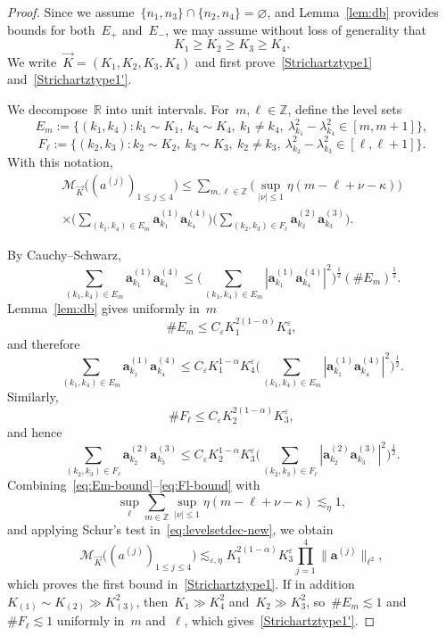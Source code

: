 \documentclass[11pt,reqno,english]{amsart}
\numberwithin{equation}{section}
\theoremstyle{plain}
\theoremstyle{definition}
\theoremstyle{remark}
\newcommand{\R}{\mathbb{R}}
\newcommand{\Z}{\mathbb{Z}}
\begin{document}
\begin{proof}
	Since we assume~$\{n_{1},n_{3}\}\cap\{n_{2},n_{4}\}=\varnothing$, and Lemma~\ref{lem:db}
	provides bounds for both~$E_{+}$ and~$E_{-}$, we may assume without loss of generality that
	\begin{equation}
		\label{eq:orderK}
		K_1\ge K_2\ge K_3\ge K_4.
	\end{equation}
	We write~$\vec K=(K_1,K_2,K_3,K_4)$ and first prove~\eqref{Strichartztype1} and~\eqref{Strichartztype1'}.

	We decompose~$\R$ into unit intervals. For~$m,\ell\in\Z$, define the level sets
	\[
	E_m:=\{(k_1,k_4): k_1\sim K_1,\ k_4\sim K_4,\ k_1\neq k_4,\
	\lambda_{k_1}^2-\lambda_{k_4}^2\in[m,m+1]\},
	\]
	\[
	F_\ell:=\{(k_2,k_3): k_2\sim K_2,\ k_3\sim K_3,\ k_2\neq k_3,\
	\lambda_{k_2}^2-\lambda_{k_3}^2\in[\ell,\ell+1]\}.
	\]
	With this notation,
	\begin{multline}
		\label{eq:levelsetdec-new}
		\mathcal{M}_{\vec{K}}\big((a^{(j)})_{1\le j\le 4}\big)
		\le
		\sum_{m,\ell\in\Z}
		\Big(\sup_{|\nu|\le 1}\eta(m-\ell+\nu-\kappa)\Big)
		\\
		\times
		\Big(\sum_{(k_1,k_4)\in E_m}
		\mathbf{a}^{(1)}_{k_1}\mathbf{a}^{(4)}_{k_4}\Big)
		\Big(\sum_{(k_2,k_3)\in F_\ell}
		\mathbf{a}^{(2)}_{k_2}\mathbf{a}^{(3)}_{k_3}\Big).
	\end{multline}

	By Cauchy--Schwarz,
	\[
	\sum_{(k_1,k_4)\in E_m}
	\mathbf{a}^{(1)}_{k_1}\mathbf{a}^{(4)}_{k_4}
	\le
	\Big(
	\sum_{(k_1,k_4)\in E_m}
	|\mathbf{a}^{(1)}_{k_1}\mathbf{a}^{(4)}_{k_4}|^2
	\Big)^{\frac12}
	(\#E_m)^{\frac12}.
	\]
	Lemma~\ref{lem:db} gives uniformly in~$m$
	\[
	\#E_m \le C_\varepsilon K_1^{2(1-\alpha)}K_4^\varepsilon,
	\]
	and therefore
	\begin{equation}
		\label{eq:Em-bound}
		\sum_{(k_1,k_4)\in E_m}
		\mathbf{a}^{(1)}_{k_1}\mathbf{a}^{(4)}_{k_4}
		\le
		C_\varepsilon K_1^{1-\alpha}K_4^\varepsilon
		\Big(
		\sum_{(k_1,k_4)\in E_m}
		|\mathbf{a}^{(1)}_{k_1}\mathbf{a}^{(4)}_{k_4}|^2
		\Big)^{\frac12}.
	\end{equation}
	Similarly,
	\[
	\#F_\ell \le C_\varepsilon K_2^{2(1-\alpha)}K_3^\varepsilon,
	\]
	and hence
	\begin{equation}
		\label{eq:Fl-bound}
		\sum_{(k_2,k_3)\in F_\ell}
		\mathbf{a}^{(2)}_{k_2}\mathbf{a}^{(3)}_{k_3}
		\le
		C_\varepsilon K_2^{1-\alpha}K_3^\varepsilon
		\Big(
		\sum_{(k_2,k_3)\in F_\ell}
		|\mathbf{a}^{(2)}_{k_2}\mathbf{a}^{(3)}_{k_3}|^2
		\Big)^{\frac12}.
	\end{equation}
	Combining~\eqref{eq:Em-bound}--\eqref{eq:Fl-bound} with
	\[
	\sup_{\ell}\sum_{m\in\Z}
	\sup_{|\nu|\le 1}
	\eta(m-\ell+\nu-\kappa)
	\lesssim_\eta 1,
	\]
	and applying Schur's test in~\eqref{eq:levelsetdec-new}, we obtain
	\[
	\mathcal{M}_{\vec{K}}\big((a^{(j)})_{1\le j\le 4}\big)
	\lesssim_{\varepsilon,\eta}
	K_1^{2(1-\alpha)}K_3^\varepsilon
	\prod_{j=1}^4\|\mathbf{a}^{(j)}\|_{\ell^2},
	\]
	which proves the first bound in~\eqref{Strichartztype1}. If in addition~$K_{(1)}\sim K_{(2)}\gg K_{(3)}^2$, then~$K_1\gg K_4^2$ and~$K_2\gg K_3^2$, so~$\#E_m\lesssim 1$ and~$\# F_{\ell}\lesssim 1$ uniformly in~$m$ and~$\ell$, which gives~\eqref{Strichartztype1'}.


\end{proof}
\end{document}
